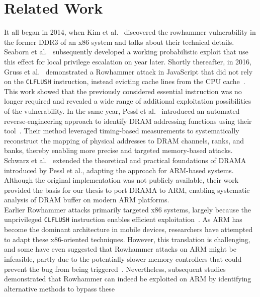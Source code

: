 \section{Related Work} \label{sec:related-work}
  It all began in 2014, when Kim et al.~\cite{paperFlippingBits} discovered the rowhammer vulnerability 
  in the former DDR3 of an x86 system and talks about their technical details.
  Seaborn et al.~\cite{paperExploitingTheDRAM} subsequently developed a working  probabilistic  exploit 
  that use this effect for local privilege escalation on year later.
  Shortly thereafter, in 2016, Gruss et al.~\cite{paperRowhammerjs} demonstrated a Rowhammer attack 
  in JavaScript that did not rely on the \texttt{CLFLUSH} instruction, instead 
  evicting cache lines from the CPU cache~\cite{paperRowhammerOnSteroids}. This work showed that the previously 
  considered essential instruction was no longer required and revealed a wide 
  range of additional exploitation possibilities of the vulnerability.
  In the same year, Pessl et al.~\cite{paperDRAMA} introduced an automated reverse-engineering 
  approach to identify DRAM addressing functions using their tool~\cite{toolDrama}. Their 
  method leveraged timing-based measurements to systematically reconstruct the 
  mapping of physical addresses to DRAM channels, ranks, and banks, thereby enabling 
  more precise and targeted memory-based attacks.
  Schwarz et al.~\cite{thesisDRAMA} extended the theoretical and practical foundations of 
  DRAMA introduced by Pessl et al., adapting the approach for ARM-based systems. 
  Although the original implementation was not publicly available, their work 
  provided the basis for our thesis to port DRAMA to ARM, enabling systematic 
  analysis of DRAM buffer on modern ARM platforms.
  \\
  Earlier Rowhammer attacks primarily targeted x86 systems, largely because 
  the unprivileged \texttt{CLFLUSH} instruction enables efficient 
  exploitation~\cite{paperFlippingBits, paperRHonRi3B+}. As ARM has become the dominant architecture 
  in mobile devices, researchers have attempted to adapt these x86-oriented 
  techniques. However, this translation is challenging, and some have even 
  suggested that Rowhammer attacks on ARM might be infeasible, partly due 
  to the potentially slower memory controllers that could prevent the bug 
  from being triggered~\cite{paperDrammer,paperTriggeringRHHardwareFault}.
  Nevertheless, subsequent studies demonstrated that Rowhammer can indeed be 
  exploited on ARM by identifying alternative methods to bypass these 
